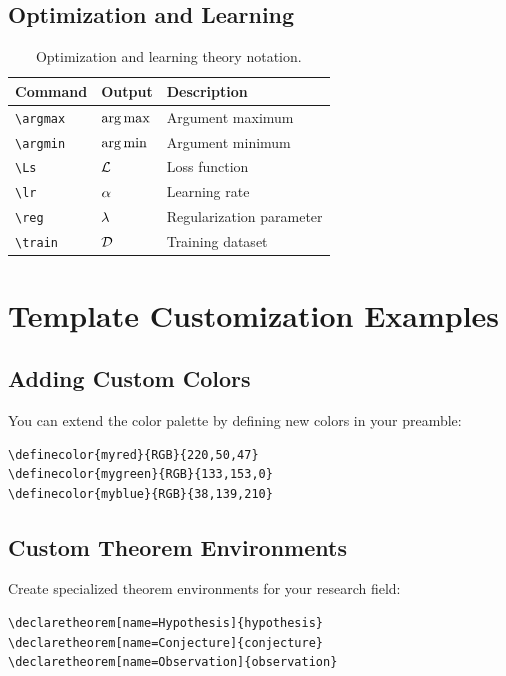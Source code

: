 \documentclass{triton}
\begin{document}
\subsection{Optimization and Learning}

\begin{table}[htbp]
\centering
\small
\begin{tabular}{@{}lll@{}}
\toprule
\textbf{Command} & \textbf{Output} & \textbf{Description} \\
\midrule
\verb|\argmax| & $\operatorname*{arg\,max}$ & Argument maximum \\
\verb|\argmin| & $\operatorname*{arg\,min}$ & Argument minimum \\
\verb|\Ls| & $\mathcal{L}$ & Loss function \\
\verb|\lr| & $\alpha$ & Learning rate \\
\verb|\reg| & $\lambda$ & Regularization parameter \\
\verb|\train| & $\mathcal{D}$ & Training dataset \\
\bottomrule
\end{tabular}
\caption{Optimization and learning theory notation.}
\end{table}

\section{Template Customization Examples}

\subsection{Adding Custom Colors}

You can extend the color palette by defining new colors in your preamble:

\begin{tcolorbox}[colback=ucsdgray!10,colframe=ucsdgray,title=Custom Color Definition]
\begin{verbatim}
\definecolor{myred}{RGB}{220,50,47}
\definecolor{mygreen}{RGB}{133,153,0}
\definecolor{myblue}{RGB}{38,139,210}
\end{verbatim}
\end{tcolorbox}

\subsection{Custom Theorem Environments}

Create specialized theorem environments for your research field:

\begin{tcolorbox}[colback=ucsdgray!10,colframe=ucsdgray,title=Custom Theorems]
\begin{verbatim}
\declaretheorem[name=Hypothesis]{hypothesis}
\declaretheorem[name=Conjecture]{conjecture}
\declaretheorem[name=Observation]{observation}
\end{verbatim}
\end{tcolorbox}
\end{document}
